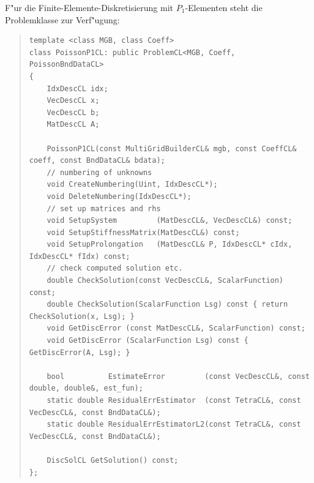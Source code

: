 \documentclass[11pt,a4paper]{article}
\newenvironment{Code}{\begin{quote}\scriptsize}{\end{quote}}
\begin{document}
F"ur die Finite-Elemente-Diskretisierung mit $P_1$-Elementen steht die
Problemklasse  zur Verf"ugung:
\begin{Code}
\begin{verbatim}
template <class MGB, class Coeff>
class PoissonP1CL: public ProblemCL<MGB, Coeff, PoissonBndDataCL>
{
    IdxDescCL idx;
    VecDescCL x;
    VecDescCL b;
    MatDescCL A;
    
    PoissonP1CL(const MultiGridBuilderCL& mgb, const CoeffCL& coeff, const BndDataCL& bdata);
    // numbering of unknowns
    void CreateNumbering(Uint, IdxDescCL*);
    void DeleteNumbering(IdxDescCL*);
    // set up matrices and rhs
    void SetupSystem         (MatDescCL&, VecDescCL&) const;
    void SetupStiffnessMatrix(MatDescCL&) const;
    void SetupProlongation   (MatDescCL& P, IdxDescCL* cIdx, IdxDescCL* fIdx) const;
    // check computed solution etc.
    double CheckSolution(const VecDescCL&, ScalarFunction) const;
    double CheckSolution(ScalarFunction Lsg) const { return CheckSolution(x, Lsg); }
    void GetDiscError (const MatDescCL&, ScalarFunction) const;
    void GetDiscError (ScalarFunction Lsg) const { GetDiscError(A, Lsg); }

    bool          EstimateError         (const VecDescCL&, const double, double&, est_fun);
    static double ResidualErrEstimator  (const TetraCL&, const VecDescCL&, const BndDataCL&);
    static double ResidualErrEstimatorL2(const TetraCL&, const VecDescCL&, const BndDataCL&);

    DiscSolCL GetSolution() const;
};
\end{verbatim}
\end{Code}
\end{document}
